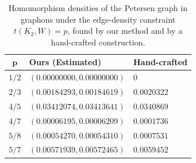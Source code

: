 \documentclass[11pt]{article}
\theoremstyle{plain}
\theoremstyle{definition}
\theoremstyle{remark}
\begin{document}
\begin{table}[t]
    \centering
  \caption{Homomorphism densities of the Petersen graph in graphons under the edge-density constraint $t(K_2, W)=p$, found by our method and by a hand-crafted construction. \label{tab:petersenresult2}}
  {\small
    \begin{tabular}{cll}
         \toprule
         $\mathbf{p}$ & \textbf{Ours (Estimated)} & \textbf{Hand-crafted}
         \\ \midrule
         $1/2$ & $(\mathit{0.00000000}, \mathit{0.00000000})$ & $0$
         \\
         $2/3$ & $(\mathit{0.00184293}, \mathit{0.00184619})$ & $0.0020322$
         \\
         $4/5$ & $(\mathit{0.03412074}, \mathit{0.03413641})$ & $0.0340869$
         \\
         $4/7$ & $(\mathit{0.00006195}, \mathit{0.00006209})$ & $0.0001736$
         \\
         $5/8$ & $(\mathit{0.00054270}, \mathit{0.00054310})$ & $0.0007531$
         \\
         $5/7$ & $(\mathit{0.00571939}, \mathit{0.00572465})$ & $0.0059452$
         \\
         \bottomrule
    \end{tabular}
    }
\end{table}
\end{document}
